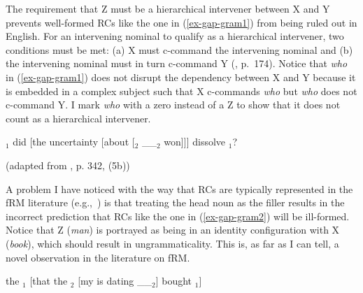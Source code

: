 The requirement that Z must be a hierarchical intervener between X and Y prevents well-formed RCs like the one in (\ref{ex-gap-gram1}) from being ruled out in English. For an intervening nominal to qualify as a hierarchical intervener, two conditions must be met: (a) X must c-command the intervening nominal and (b) the intervening nominal must in turn c-command Y (\cite{rizzi2013}, p.~174). Notice that \textit{who} in (\ref{ex-gap-gram1}) does not disrupt the dependency between X and Y because it is embedded in a complex subject such that X c-commands \textit{who} but \textit{who} does not c-command Y. I mark \textit{who} with a zero instead of a Z to show that it does not count as a hierarchical intervener.

\pex \label{ex-gap-gram1}
$_1$ did [the uncertainty [about [$_2$ \_\_$_2$ won]]] dissolve $_1$?
\par\nobreak\vspace{24pt}
\hfill (adapted from \cite{rizzi2018}, p. 342, (5b))
\xe 

A problem I have noticed with the way that RCs are typically represented in the fRM literature (e.g.,~\cite{rizzi2013,rizzi2018}) is that treating the head noun as the filler results in the incorrect prediction that RCs like the one in (\ref{ex-gap-gram2}) will be ill-formed. Notice that Z (\textit{man}) is portrayed as being in an identity configuration with X (\textit{book}), which should result in ungrammaticality. This is, as far as I can tell, a novel observation in the literature on fRM.

\pex \label{ex-gap-gram2}
the $_1$ [that the $_2$ [my  is dating \_\_$_2$] bought $_1$]
\par\nobreak\vspace{18pt}
\xe 

